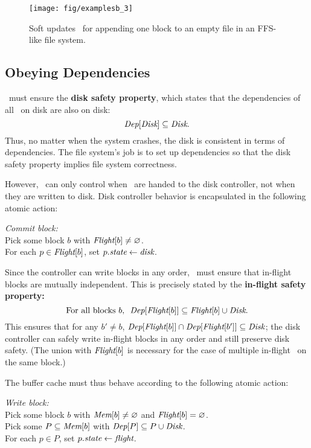\begin{figure}[htb]
  \centering
  \texttt{[image: fig/examplesb\_3]}
  \caption{\label{fig:softupdate} Soft updates \patches\
  for appending one block to an empty file in an FFS-like file system.}
\end{figure}


\subsection{Obeying Dependencies}
\label{sec:patch:dependencies}

\Kudos\ must ensure the \textbf{disk safety property}, which states that
 the dependencies of all \patches\ on disk are also on disk:
%
\[ \PDepset{\PDisk} \subseteq \PDisk. \]
%
Thus, no matter when the system crashes, the disk is consistent in terms of
dependencies.
%
The file system's job is to set up dependencies so that the disk safety
property implies file system correctness.

However, \Kudos\ can only control when \patches\ are handed to the disk
 controller, not when they are written to disk.
%
Disk controller behavior is encapsulated in the following atomic action:

\begin{tabbing}
\textit{Commit block:} \\
\quad Pick some block $b$ with $\PInf[b] \neq \emptyset$. \\
\quad For each $p \in \PInf[b]$, set $p.\textit{state} \gets \textit{disk}$.
\end{tabbing}

\noindent
%
Since the controller can write blocks in any order, \Kudos\ must ensure
that in-flight blocks are mutually independent.  This is precisely stated
by the \textbf{in-flight safety property:}
%
\[ \text{For all blocks $b$,~~} \PDepset{\PInf[b]} \subseteq \PInf[b] \cup \PDisk . \]
%
This ensures that for any $b' \neq b$, $\PDepset{\PInf[b]} \cap
 \PDepset{\PInf[b']} \subseteq \PDisk$; the disk controller can safely
 write in-flight blocks in any order and still preserve disk safety.
%
(The union with $\PInf[b]$ is necessary for the case of multiple in-flight
\patches\ on the same block.)


The buffer cache must thus behave according to the following atomic action:

\begin{tabbing}
\textit{Write block:} \\
\quad Pick some block $b$ with $\PMem[b] \neq \emptyset$ and $\PInf[b] =
\emptyset$. \\
\quad Pick some $P \subseteq \PMem[b]$ with $\PDepset{P} \subseteq P \cup
\PDisk$. \\
\quad For each $p \in P$, set $p.\textit{state} \gets \textit{flight}$.
\end{tabbing}

